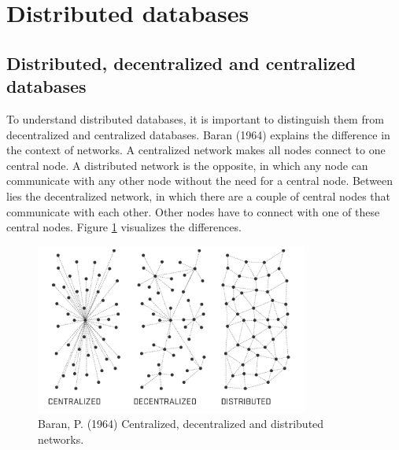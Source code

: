 \section{Distributed databases}

\subsection{Distributed, decentralized and centralized databases}

To understand distributed databases, it is important to distinguish them from decentralized and centralized databases. Baran (1964) \cite{baran-distributed-communications} explains the difference in the context of networks. A centralized network makes all nodes connect to one central node. A distributed network is the opposite, in which any node can communicate with any other node without the need for a central node. Between lies the decentralized network, in which there are a couple of central nodes that communicate with each other. Other nodes have to connect with one of these central nodes.
Figure \ref{fig:baran-networks} visualizes the differences.

\begin{figure}[h]
\centering
\includegraphics[width=0.8\textwidth]{paper-images/baran_networks.png}
\caption{Baran, P. (1964) Centralized, decentralized and distributed networks.} 
\label{fig:baran-networks}
\end{figure} 

